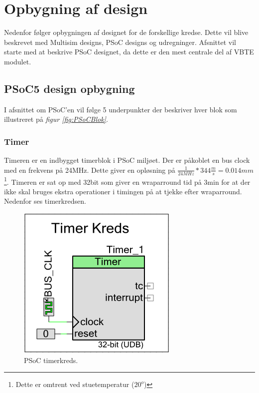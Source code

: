 \section{Opbygning af design}
Nedenfor følger opbygningen af designet for de forskellige kredse. Dette vil blive beskrevet med Multisim designs, PSoC designs og udregninger. Afsnittet vil starte med at beskrive PSoC designet, da dette er den mest centrale del af VBTE modulet.

\subsection{PSoC5 design opbygning}
I afsnittet om PSoC'en vil følge 5 underpunkter der beskriver hver blok som illustreret på \textit{figur \ref{fig:PSoCBlok}}.
\subsubsection{Timer}
Timeren er en indbygget timerblok i PSoC miljøet. Der er påkoblet en bus clock med en frekvens på 24MHz. Dette giver en opløsning på $\frac{1}{24MHz}*344\frac{m}{s}=0.014mm$\footnote{Dette er omtrent ved stuetemperatur ($20^{o}$)}. Timeren er sat op med 32bit som giver en wraparround tid på 3min for at der ikke skal bruges ekstra operationer i timingen på at tjekke efter wraparround. Nedenfor ses timerkredsen.
\begin{figure}[H]
\centering
\includegraphics[scale=.5]{billeder/psoctimerkreds}
\caption{PSoC timerkreds.}
\label{fig:timerkreds}
\end{figure}
